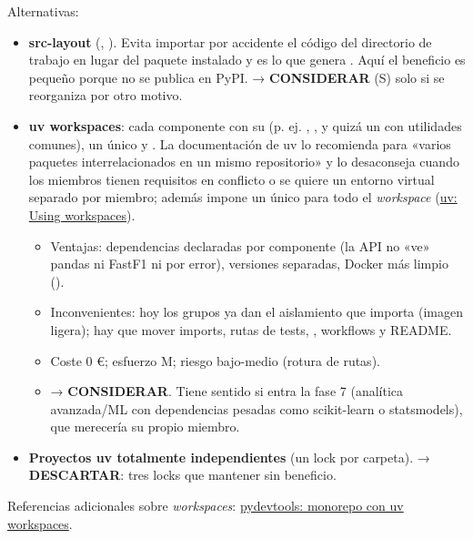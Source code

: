 Alternativas:

\begin{itemize}
\item \textbf{src-layout} (, ). Evita importar por accidente el código del directorio de trabajo en lugar del paquete instalado y es lo que genera . Aquí el beneficio es pequeño porque no se publica en PyPI. → \textbf{CONSIDERAR} (S) solo si se reorganiza por otro motivo.
\item \textbf{uv workspaces}: cada componente con su  (p. ej. , , y quizá un  con utilidades comunes), un único  y . La documentación de uv lo recomienda para «varios paquetes interrelacionados en un mismo repositorio» y lo desaconseja cuando los miembros tienen requisitos en conflicto o se quiere un entorno virtual separado por miembro; además impone un único  para todo el \emph{workspace} (\href{https://docs.astral.sh/uv/concepts/projects/workspaces/}{uv: Using workspaces}).
\begin{itemize}
\item Ventajas: dependencias declaradas por componente (la API no «ve» pandas ni FastF1 ni por error), versiones separadas, Docker más limpio ().
\item Inconvenientes: hoy los grupos ya dan el aislamiento que importa (imagen ligera); hay que mover imports, rutas de tests, , workflows y README.
\item Coste 0 €; esfuerzo M; riesgo bajo-medio (rotura de rutas).
\item → \textbf{CONSIDERAR}. Tiene sentido si entra la fase 7 (analítica avanzada/ML con dependencias pesadas como scikit-learn o statsmodels), que merecería su propio miembro.
\end{itemize}
\item \textbf{Proyectos uv totalmente independientes} (un lock por carpeta). → \textbf{DESCARTAR}: tres locks que mantener sin beneficio.
\end{itemize}

Referencias adicionales sobre \emph{workspaces}: \href{https://pydevtools.com/handbook/how-to/how-to-set-up-a-python-monorepo-with-uv-workspaces/}{pydevtools: monorepo con uv workspaces}.

